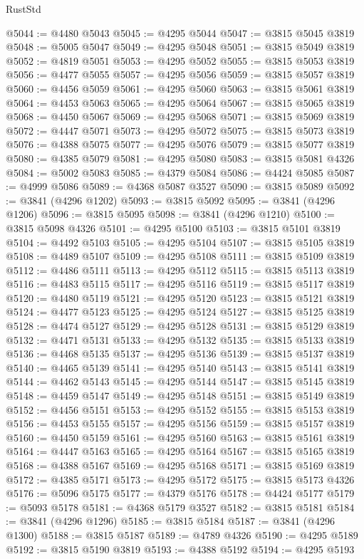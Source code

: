 \begin{lexlean}{RustStd}
\begin{coremodule}
@5044 := @4480 @5043
@5045 := @4295 @5044
@5047 := @3815 @5045 @3819
@5048 := @5005 @5047
@5049 := @4295 @5048
@5051 := @3815 @5049 @3819
@5052 := @4819 @5051
@5053 := @4295 @5052
@5055 := @3815 @5053 @3819
@5056 := @4477 @5055
@5057 := @4295 @5056
@5059 := @3815 @5057 @3819
@5060 := @4456 @5059
@5061 := @4295 @5060
@5063 := @3815 @5061 @3819
@5064 := @4453 @5063
@5065 := @4295 @5064
@5067 := @3815 @5065 @3819
@5068 := @4450 @5067
@5069 := @4295 @5068
@5071 := @3815 @5069 @3819
@5072 := @4447 @5071
@5073 := @4295 @5072
@5075 := @3815 @5073 @3819
@5076 := @4388 @5075
@5077 := @4295 @5076
@5079 := @3815 @5077 @3819
@5080 := @4385 @5079
@5081 := @4295 @5080
@5083 := @3815 @5081 @4326
@5084 := @5002 @5083
@5085 := @4379 @5084
@5086 := @4424 @5085
@5087 := @4999 @5086
@5089 := @4368 @5087 @3527
@5090 := @3815 @5089
@5092 := @3841 (@4296 @1202)
@5093 := @3815 @5092
@5095 := @3841 (@4296 @1206)
@5096 := @3815 @5095
@5098 := @3841 (@4296 @1210)
@5100 := @3815 @5098 @4326
@5101 := @4295 @5100
@5103 := @3815 @5101 @3819
@5104 := @4492 @5103
@5105 := @4295 @5104
@5107 := @3815 @5105 @3819
@5108 := @4489 @5107
@5109 := @4295 @5108
@5111 := @3815 @5109 @3819
@5112 := @4486 @5111
@5113 := @4295 @5112
@5115 := @3815 @5113 @3819
@5116 := @4483 @5115
@5117 := @4295 @5116
@5119 := @3815 @5117 @3819
@5120 := @4480 @5119
@5121 := @4295 @5120
@5123 := @3815 @5121 @3819
@5124 := @4477 @5123
@5125 := @4295 @5124
@5127 := @3815 @5125 @3819
@5128 := @4474 @5127
@5129 := @4295 @5128
@5131 := @3815 @5129 @3819
@5132 := @4471 @5131
@5133 := @4295 @5132
@5135 := @3815 @5133 @3819
@5136 := @4468 @5135
@5137 := @4295 @5136
@5139 := @3815 @5137 @3819
@5140 := @4465 @5139
@5141 := @4295 @5140
@5143 := @3815 @5141 @3819
@5144 := @4462 @5143
@5145 := @4295 @5144
@5147 := @3815 @5145 @3819
@5148 := @4459 @5147
@5149 := @4295 @5148
@5151 := @3815 @5149 @3819
@5152 := @4456 @5151
@5153 := @4295 @5152
@5155 := @3815 @5153 @3819
@5156 := @4453 @5155
@5157 := @4295 @5156
@5159 := @3815 @5157 @3819
@5160 := @4450 @5159
@5161 := @4295 @5160
@5163 := @3815 @5161 @3819
@5164 := @4447 @5163
@5165 := @4295 @5164
@5167 := @3815 @5165 @3819
@5168 := @4388 @5167
@5169 := @4295 @5168
@5171 := @3815 @5169 @3819
@5172 := @4385 @5171
@5173 := @4295 @5172
@5175 := @3815 @5173 @4326
@5176 := @5096 @5175
@5177 := @4379 @5176
@5178 := @4424 @5177
@5179 := @5093 @5178
@5181 := @4368 @5179 @3527
@5182 := @3815 @5181
@5184 := @3841 (@4296 @1296)
@5185 := @3815 @5184
@5187 := @3841 (@4296 @1300)
@5188 := @3815 @5187
@5189 := @4789 @4326
@5190 := @4295 @5189
@5192 := @3815 @5190 @3819
@5193 := @4388 @5192
@5194 := @4295 @5193

\end{coremodule}
\end{lexlean}
